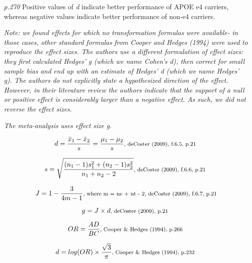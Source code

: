 \documentclass{article}
\begin{document}
\textit{p.270} Positive values of \textit{d} indicate better performance of APOE e4 carriers, whereas negative values indicate better performance of non-e4 carriers.

\vspace{3 mm}
\textit{Note: we found effects for which no transformation formulas were available- in those cases, other standard formulas from Cooper and Hedges (1994) were used to reproduce the effect sizes. The authors use a different formulation of effect sizes: they first calculated Hedges' g (which we name Cohen's d), then correct for small sample bias and end up with an estimate of Hedges' d (which we name Hedges' g). The authors do not explicitly state a hypothesized direction of the effect. However, in their literature review the authors indicate that the support of a null or positive effect is considerably larger than a negative effect. As such, we did not reverse the effect sizes. }

\vspace{3mm}
\textit{The meta-analysis uses effect size g.}

\begin{equation*}
d={\frac {{\bar {x}}_{1}-{\bar {x}}_{2}}{s}}={\frac {\mu_{1}-\mu_{2}}{s}}  \mbox {\footnotesize, deCoster (2009), f.6.5, p.21 } 
\end{equation*}

\begin{equation*}
s={\sqrt {\frac {(n_{1}-1)s_{1}^{2}+(n_{2}-1)s_{2}^{2}}{n_{1}+n_{2}-2}}} \mbox{\footnotesize, deCoster (2009), f.6.6, p.21 } 
\end{equation*}

\begin{equation*}
J={1-{\frac {3}{4m-1}}} \mbox {\footnotesize, where m = ne + nt - 2, deCoster (2009), f.6.7, p.21}
\end{equation*} 

\begin{equation*}
g=J \times d \mbox{\footnotesize,  deCoster (2009), p.21 } 
\end{equation*}

\begin{equation*}
OR={\frac {AD}{BC}} \mbox{\footnotesize, Cooper \& Hedges (1994), p.266 }
\end{equation*}

\begin{equation*}
d=log(OR) \times {\frac {\sqrt{3}}{\pi}} \mbox{\footnotesize, Cooper \& Hedges (1994), p.232 }
\end{equation*}
\end{document}
